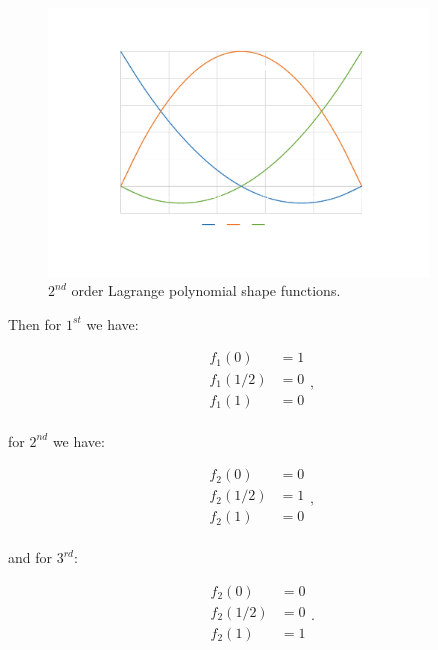 \documentclass[10pt,b5paper,titlepage]{book}
\begin{document}
\begin{figure}[h]
    \centering
    \includegraphics[width=0.90\textwidth]{img/matrix_poly.pdf}
    \caption{$2^{nd}$ order Lagrange polynomial shape functions.}
    \label{fig:matrix-poly-pdf}
\end{figure}

Then for $1^{st}$ we have:

\begin{equation}
    \begin{array}{ll}
        f_{1}(0) &= 1 \\
        f_{1}(1/2) &= 0 \\
        f_{1}(1) &= 0 \\
    \end{array}
,\end{equation}

for $2^{nd}$ we have:

\begin{equation}
    \begin{array}{ll}
        f_{2}(0) &= 0 \\
        f_{2}(1/2) &= 1 \\
        f_{2}(1) &= 0 \\
    \end{array}
,\end{equation}

and for $3^{rd}$:

\begin{equation}
    \begin{array}{ll}
        f_{2}(0) &= 0 \\
        f_{2}(1/2) &= 0 \\
        f_{2}(1) &= 1 \\
    \end{array}
.\end{equation}
\end{document}
